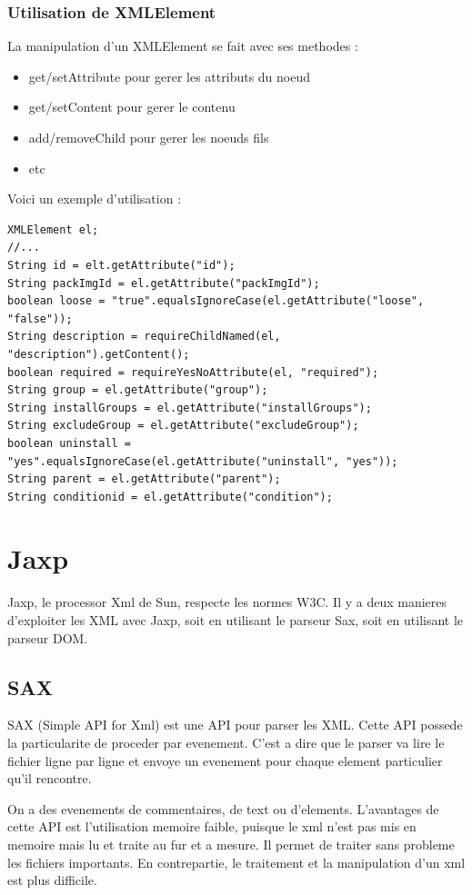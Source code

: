 \subsubsection{Utilisation de XMLElement}
La manipulation d'un XMLElement se fait avec ses methodes :
\begin{itemize}
	\item get/setAttribute pour gerer les attributs du noeud
	\item get/setContent pour gerer le contenu
	\item add/removeChild pour gerer les noeuds fils
	\item etc
\end{itemize}

Voici un exemple d'utilisation :
\begin{lstlisting}
XMLElement el;
//...
String id = elt.getAttribute("id");
String packImgId = el.getAttribute("packImgId");
boolean loose = "true".equalsIgnoreCase(el.getAttribute("loose", "false"));
String description = requireChildNamed(el, "description").getContent();
boolean required = requireYesNoAttribute(el, "required");
String group = el.getAttribute("group");
String installGroups = el.getAttribute("installGroups");
String excludeGroup = el.getAttribute("excludeGroup");
boolean uninstall = "yes".equalsIgnoreCase(el.getAttribute("uninstall", "yes"));
String parent = el.getAttribute("parent");
String conditionid = el.getAttribute("condition");
\end{lstlisting}
\section{Jaxp}
Jaxp, le processor Xml de Sun, respecte les normes W3C. Il y a deux manieres d'exploiter les XML avec Jaxp, soit en utilisant le parseur Sax, soit en utilisant le parseur DOM.
\subsection{SAX}
SAX (Simple API for Xml) est une API pour parser les XML. Cette API possede la particularite de proceder par evenement. C'est a dire que le parser va lire le fichier ligne par ligne et envoye un evenement pour chaque element particulier qu'il rencontre. 

On a des evenements de commentaires, de text ou d'elements. L'avantages de cette API est l'utilisation memoire faible, puisque le xml n'est pas mis en memoire mais lu et traite au fur et a mesure. Il permet de traiter sans probleme les fichiers importants. En contrepartie, le traitement et la manipulation d'un xml est plus difficile.
